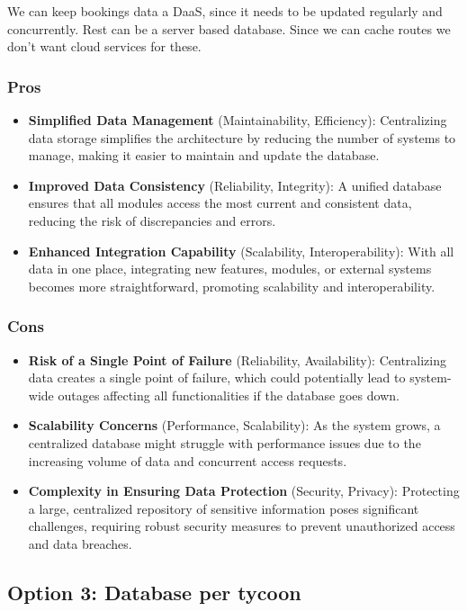 We can keep bookings data a DaaS, since it needs to be updated regularly and concurrently. Rest can be a server based database. Since we can cache routes we don't want cloud services for these. 

\subsubsection*{Pros}
\begin{itemize}[noitemsep]
    \item \textbf{Simplified Data Management} (Maintainability, Efficiency): Centralizing data storage simplifies the architecture by reducing the number of systems to manage, making it easier to maintain and update the database.
    \item \textbf{Improved Data Consistency} (Reliability, Integrity): A unified database ensures that all modules access the most current and consistent data, reducing the risk of discrepancies and errors.
    \item \textbf{Enhanced Integration Capability} (Scalability, Interoperability): With all data in one place, integrating new features, modules, or external systems becomes more straightforward, promoting scalability and interoperability.
\end{itemize}

\subsubsection*{Cons}
\begin{itemize}[noitemsep]
    \item \textbf{Risk of a Single Point of Failure} (Reliability, Availability): Centralizing data creates a single point of failure, which could potentially lead to system-wide outages affecting all functionalities if the database goes down.
    \item \textbf{Scalability Concerns} (Performance, Scalability): As the system grows, a centralized database might struggle with performance issues due to the increasing volume of data and concurrent access requests.
    \item \textbf{Complexity in Ensuring Data Protection} (Security, Privacy): Protecting a large, centralized repository of sensitive information poses significant challenges, requiring robust security measures to prevent unauthorized access and data breaches.
\end{itemize}

\subsection*{Option 3: Database per tycoon}

